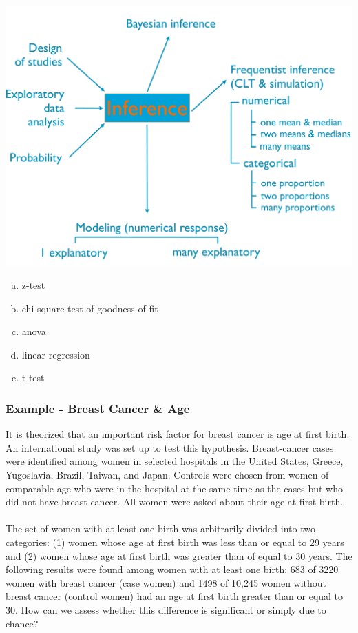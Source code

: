 \documentclass[slidestop,compress,mathserif,12pt,t,professionalfonts,xcolor=table]{beamer}
\newcommand{\solnMult}[1]{#1}
\begin{document}
\begin{frame}

{
{\scriptsize
{}}}
{
 \includegraphics[width=\textwidth]{figures/map/inference}
}

\begin{enumerate}[(a)]
\item z-test
\item chi-square test of goodness of fit
\item \solnMult{anova}
\item \solnMult{linear regression}
\item t-test
\end{enumerate}

\end{frame}


\begin{frame}[shrink]
\frametitle{Example - Breast Cancer \& Age}

{\small
It is theorized that an important risk factor for breast cancer is age at first birth. An international study was set up to test this hypothesis. Breast-cancer cases were identified among women in selected hospitals in the United States, Greece, Yugoslavia, Brazil, Taiwan, and Japan. Controls were chosen from women of comparable age who were in the hospital at the same time as the cases but who did not have breast cancer. All women were asked about their age at first birth.\\
~\\
The set of women with at least one birth was arbitrarily divided into two categories: (1) women whose age at first birth was less than or equal to 29 years and (2) women whose age at first birth was greater than of equal to 30 years. The following results were found among women with at least one birth: 683 of 3220 women with breast cancer (case women) and 1498 of 10,245 women without breast cancer (control women) had an age at first birth greater than or equal to 30. How can we assess whether this difference is significant or simply due to chance?\\
}
\end{frame}
\end{document}
